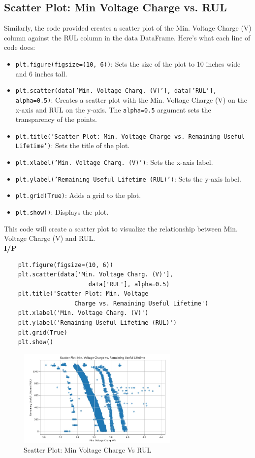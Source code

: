 \subsection{Scatter Plot: Min Voltage Charge vs. RUL}
Similarly, the code provided creates a scatter plot of the Min. Voltage Charge (V) column against the RUL column in the data DataFrame. Here’s what each line of code does:
\begin{itemize}
    \item \texttt{plt.figure(figsize=(10, 6))}: Sets the size of the plot to 10 inches wide and 6 inches tall.
    \item \texttt{plt.scatter(data['Min. Voltage Charg. (V)'], data['RUL'], alpha=0.5)}: Creates a scatter plot with the Min. Voltage Charge (V) on the x-axis and RUL on the y-axis. The \texttt{alpha=0.5} argument sets the transparency of the points.
    \item \texttt{plt.title('Scatter Plot: Min. Voltage Charge vs. Remaining Useful Lifetime')}: Sets the title of the plot.
    \item \texttt{plt.xlabel('Min. Voltage Charg. (V)')}: Sets the x-axis label.
    \item \texttt{plt.ylabel('Remaining Useful Lifetime (RUL)')}: Sets the y-axis label.
    \item \texttt{plt.grid(True)}: Adds a grid to the plot.
    \item \texttt{plt.show()}: Displays the plot.
\end{itemize}
This code will create a scatter plot to visualize the relationship between Min. Voltage Charge (V) and RUL.\\
\noindent
\textbf{I/P} \\[-2.5em] %
\begin{verbatim}
    plt.figure(figsize=(10, 6))  
    plt.scatter(data['Min. Voltage Charg. (V)'],
                        data['RUL'], alpha=0.5) 
    plt.title('Scatter Plot: Min. Voltage 
                    Charge vs. Remaining Useful Lifetime') 
    plt.xlabel('Min. Voltage Charg. (V)')  
    plt.ylabel('Remaining Useful Lifetime (RUL)') 
    plt.grid(True) 
    plt.show()    
\end{verbatim}
\newpage
\begin{figure}[H]
    \centering
    \includegraphics[width=0.7\textwidth]{scatter_plot_min_voltage_vs_rul.jpg}
    \caption{Scatter Plot: Min Voltage Charge Vs RUL}
    \label{fig:scatter_plot_min_voltage_vs_rul}
\end{figure}

